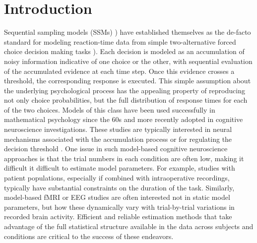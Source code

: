 \documentclass[letterpaper,10pt,english]{sphinxmanual}
\begin{document}
\section{Introduction}
\label{intro:introduction}\label{intro:index-0}\label{intro:chap-introduction}\label{intro::doc}
Sequential sampling models (SSMs) \citep{TownsendAshby83}) have established themselves as the de-facto standard for modeling reaction-time data from simple two-alternative forced choice decision making tasks \citep{SmithRatcliff04}). Each decision is modeled as an accumulation of noisy information indicative of one choice or the other, with sequential evaluation of the accumulated evidence at each time step. Once this evidence crosses a threshold, the corresponding response is executed. This simple assumption about the underlying psychological process has the appealing property of reproducing not only choice probabilities, but the full distribution of response times for each of the two choices. Models of this class have been used successfully in mathematical psychology since the 60s and more recently adopted in cognitive neuroscience investigations. These studies are typically interested in neural mechanisms associated with the accumulation process or for regulating the decision threshold \citep[e.g.][]{ForstmannDutilhBrownEtAl08,CavanaghWieckiCohenEtAl11,RatcliffPhiliastidesSajda09}. One issue in such model-based cognitive neuroscience approaches is that the trial numbers in each condition are often low, making it difficult it difficult to estimate model parameters. For example, studies with patient populations, especially if combined with intraoperative recordings, typically have substantial constraints on the duration of the task. Similarly, model-based fMRI or EEG studies are often interested not in static model parameters, but how these dynamically vary with trial-by-trial variations in recorded brain activity. Efficient and reliable estimation methods that take advantage of the full statistical structure available in the data across subjects and conditions are critical to the success of these endeavors.\\
\end{document}
